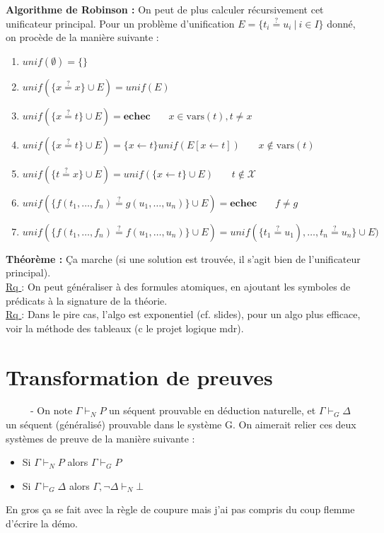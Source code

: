 \documentclass[11pt,a4paper]{article}
\begin{document}
\textbf{Algorithme de Robinson :} On peut de plus calculer récursivement cet unificateur principal. Pour un problème d'unification $E = \{ t_i\stackrel{?}{=} u_i \ | \ i \in I \}$ donné, on procède de la manière suivante :
\begin{enumerate}
\item $unif(\emptyset)=\{\}$
\item $unif(\{x \stackrel{?}{=}x \} \cup E)=unif(E)$
\item $unif(\{x \stackrel{?}{=}t \} \cup E)=\textbf{echec}$ \ \ \ $x \in \text{vars}(t), t\neq x$
\item $unif(\{x \stackrel{?}{=}t \} \cup E)=\{x \leftarrow t\}unif(E[x\leftarrow t])$ \ \ \ $x \notin \text{vars}(t)$
\item $unif(\{t \stackrel{?}{=} x \} \cup E)=unif(\{x \leftarrow t\}\cup E)$ \ \ \ $t \notin \mathcal{X}$
\item $unif(\{f(t_1,\dots,f_n)\stackrel{?}{=}g(u_1,\dots,u_n)\}\cup E)=\textbf{echec}$ \ \ \ $f \neq g$
\item $unif(\{f(t_1,\dots,f_n)\stackrel{?}{=}f(u_1,\dots,u_n)\}\cup E)=unif(\{t_1\stackrel{?}{=}u_1),\dots,t_n\stackrel{?}{=}u_n\}\cup E)$ \\
\end{enumerate}

\textbf{Théorème :} Ça marche (si une solution est trouvée, il s’agit bien de l’unificateur principal).\\

\underline{Rq }: On peut généraliser à des formules atomiques, en ajoutant les symboles de prédicats à la signature de la théorie. \\

\underline{Rq }: Dans le pire cas, l'algo est exponentiel (cf. slides), pour un algo plus efficace, voir la méthode des tableaux (c le projet logique mdr).

\section{Transformation de preuves}

\ \ \ \ \ - On note $\Gamma \vdash_N P$ un séquent prouvable en déduction naturelle, et $\Gamma \vdash_G \Delta$ un séquent (généralisé) prouvable dans le système G. On aimerait relier ces deux systèmes de preuve de la manière suivante :
\begin{itemize}
\item Si $\Gamma \vdash_N P$ alors $\Gamma \vdash_G P$
\item Si $\Gamma \vdash_G \Delta$ alors $\Gamma, \lnot \Delta \vdash_N \bot$ \\
\end{itemize}

En gros ça se fait avec la règle de coupure mais j'ai pas compris du coup flemme d'écrire la démo.
\end{document}
